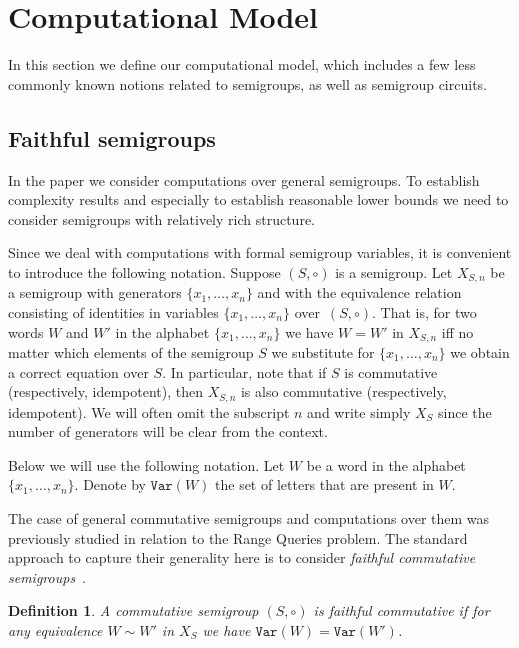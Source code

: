 \documentclass[11pt,letterpaper]{article}
\newtheorem{definition}{Definition}
\newcommand{\var}{\texttt{Var}}
\begin{document}
\section{Computational Model}

In this section we define our computational model, which includes a few less
commonly known notions related to semigroups, as well as semigroup circuits.

\subsection{Faithful semigroups}

In the paper we consider computations over general semigroups. To establish
complexity results and especially to establish reasonable lower bounds we need
to consider semigroups with relatively rich structure.

Since we deal with computations with formal semigroup variables, it is
convenient to introduce the following notation. Suppose $(S, \circ)$ is a
semigroup. Let $X_{S,n}$ be a semigroup with generators $\{x_1,\ldots, x_n\}$
and with the equivalence relation consisting of identities in variables
$\{x_1,\ldots, x_n\}$ over~$(S,\circ)$. That is, for two words $W$ and $W'$ in
the alphabet $\{x_1,\ldots,x_n\}$ we have $W=W'$ in $X_{S,n}$ iff no matter which
elements of the semigroup $S$ we substitute for $\{x_1,\ldots, x_n\}$ we obtain
a correct equation over $S$. In particular, note that if $S$ is commutative
(respectively, idempotent), then $X_{S,n}$ is also commutative (respectively,
idempotent). We will often omit the subscript $n$ and write simply $X_S$ since the number of generators will be clear from the context.

Below we will use the following notation. Let $W$ be a word in the alphabet
$\{x_1,\ldots, x_n\}$. Denote by $\var(W)$ the set of letters that are present
in $W$.

The case of general commutative semigroups and computations over them was
previously studied in relation to the Range Queries problem. The standard
approach to capture their generality here is to consider \emph{faithful
commutative semigroups}~\cite{DBLP:conf/stoc/Yao82,DBLP:journals/ijcga/ChazelleR91}.

\begin{definition}
A commutative semigroup $(S, \circ)$ is \emph{faithful commutative} if for any
equivalence $W\sim W'$ in $X_S$ we have $\var(W)=\var(W')$.
\end{definition}
\end{document}
